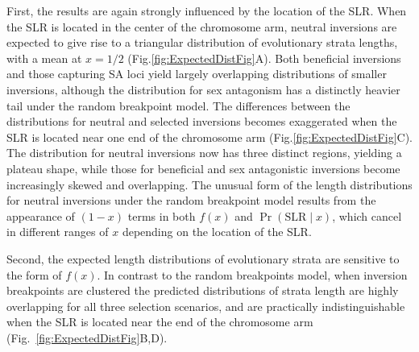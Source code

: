 \documentclass[11pt]{article}
\begin{document}
First, the results are again strongly influenced by the location of the SLR. When the SLR is located in the center of the chromosome arm, neutral inversions are expected to give rise to a triangular distribution of evolutionary strata lengths, with a mean at $x = 1/2$ (Fig.\ref{fig:ExpectedDistFig}A). Both beneficial inversions and those capturing SA loci yield largely overlapping distributions of smaller inversions, although the distribution for sex antagonism has a distinctly heavier tail under the random breakpoint model. The differences between the distributions for neutral and selected inversions becomes exaggerated when the SLR is located near one end of the chromosome arm (Fig.\ref{fig:ExpectedDistFig}C). The distribution for neutral inversions now has three distinct regions, yielding a plateau shape, while those for beneficial and sex antagonistic inversions become increasingly skewed and overlapping. The unusual form of the length distributions for neutral inversions under the random breakpoint model results from the appearance of $(1 - x)$ terms in both $f(x)$ and $\Pr(\text{SLR} \mid x)$, which cancel in different ranges of $x$ depending on the location of the SLR.  

Second, the expected length distributions of evolutionary strata are sensitive to the form of $f(x)$. In contrast to the random breakpoints model, when inversion breakpoints are clustered the predicted distributions of strata length are highly overlapping for all three selection scenarios, and are practically indistinguishable when the SLR is located near the end of the chromosome arm (Fig.~\ref{fig:ExpectedDistFig}B,D). \vspace{12pt}

\end{document}
